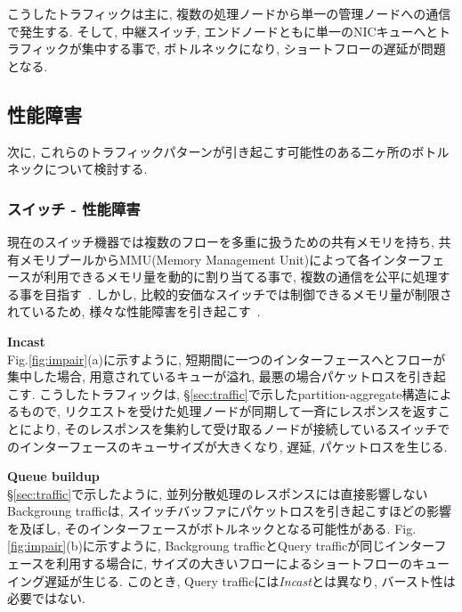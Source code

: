 こうしたトラフィックは主に, 複数の処理ノードから単一の管理ノードへの通信で発生する.
そして, 中継スイッチ, エンドノードともに単一のNICキューへとトラフィックが集中する事で, ボトルネックになり,
ショートフローの遅延が問題となる\cite{bottleneck}.

\subsection{性能障害}
\label{sec:expected_effect}
次に, これらのトラフィックパターンが引き起こす可能性のある二ヶ所のボトルネックについて検討する.

\subsubsection{スイッチ - 性能障害}
現在のスイッチ機器では複数のフローを多重に扱うための共有メモリを持ち, 共有メモリプールからMMU(Memory Management
Unit)によって各インターフェースが利用できるメモリ量を動的に割り当てる事で, 複数の通信を公平に処理する事を目指す~\cite{flexible}.
しかし, 比較的安価なスイッチでは制御できるメモリ量が制限されているため,
様々な性能障害を引き起こす~\cite{flexible}.

{\bf Incast}\\
\label{subsec:incast}
Fig.\ref{fig:impair}(a)に示すように, 短期間に一つのインターフェースへとフローが集中した場合, 用意されているキューが溢れ,
最悪の場合パケットロスを引き起こす.
こうしたトラフィックは, \S \ref{sec:traffic}で示したpartition-aggregate構造によるもので,
リクエストを受けた処理ノードが同期して一斉にレスポンスを返すことにより,
そのレスポンスを集約して受け取るノードが接続しているスイッチでのインターフェースのキューサイズが大きくなり, 遅延, パケットロスを生じる.

{\bf Queue buildup}\\
\label{subsec:queue}
\S \ref{sec:traffic}で示したように, 並列分散処理のレスポンスには直接影響しないBackgroung trafficは,
スイッチバッファにパケットロスを引き起こすほどの影響を及ぼし, そのインターフェースがボトルネックとなる可能性がある.
Fig.\ref{fig:impair}(b)に示すように, Backgroung trafficとQuery trafficが同じインターフェースを利用する場合に,
サイズの大きいフローによるショートフローのキューイング遅延が生じる.
このとき, Query trafficには{\it Incast}とは異なり, バースト性は必要ではない.

